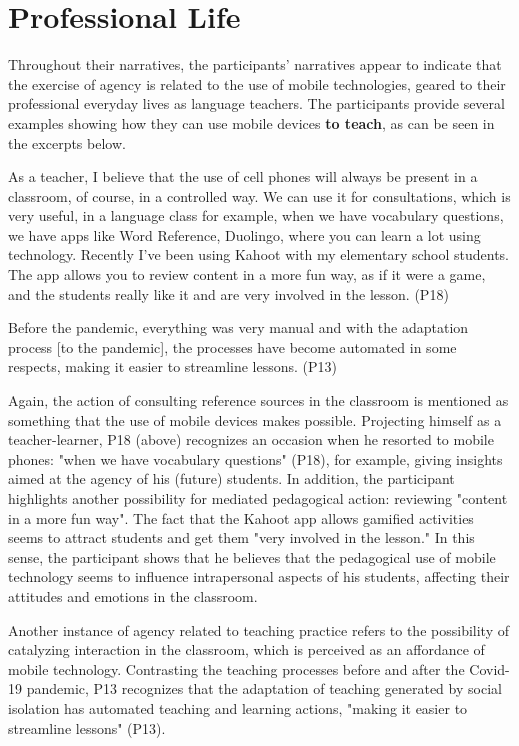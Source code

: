 \section{Professional Life}

Throughout their narratives, the
participants' narratives appear to indicate that the exercise of agency
is related to the use of mobile technologies, geared to their
professional everyday lives as language teachers. The participants
provide several examples showing how they can use mobile devices
\textbf{to teach}, as can be seen in the excerpts below.

As a teacher, I believe that the use of cell phones will always be
present in a classroom, of course, in a controlled way. We can use it
for consultations, which is very useful, in a language class for
example, when we have vocabulary questions, we have apps like Word
Reference, Duolingo, where you can learn a lot using technology.
Recently I've been using Kahoot with my elementary
school students. The app allows you to review content in a more fun way,
as if it were a game, and the students really like it and are very
involved in the lesson. (P18)

Before the pandemic, everything was very manual and with the adaptation
process {[}to the pandemic{]}, the processes have become automated in
some respects, making it easier to streamline lessons. (P13)

Again, the action of consulting reference sources in the classroom is
mentioned as something that the use of mobile devices makes possible.
Projecting himself as a teacher-learner, P18 (above) recognizes an
occasion when he resorted to mobile phones: "when we have vocabulary
questions" (P18), for example, giving insights aimed at the agency of
his (future) students. In addition, the participant highlights another
possibility for mediated pedagogical action: reviewing "content in a
more fun way". The fact that the Kahoot app allows gamified activities
seems to attract students and get them "very involved in the lesson." In
this sense, the participant shows that he believes that the pedagogical
use of mobile technology seems to influence intrapersonal aspects of his
students, affecting their attitudes and emotions in the classroom.

Another instance of agency related to teaching practice refers to the
possibility of catalyzing interaction in the classroom, which is
perceived as an affordance of mobile technology. Contrasting the
teaching processes before and after the Covid-19 pandemic, P13
recognizes that the adaptation of teaching generated by social isolation
has automated teaching and learning actions, "making it easier to
streamline lessons" (P13).

